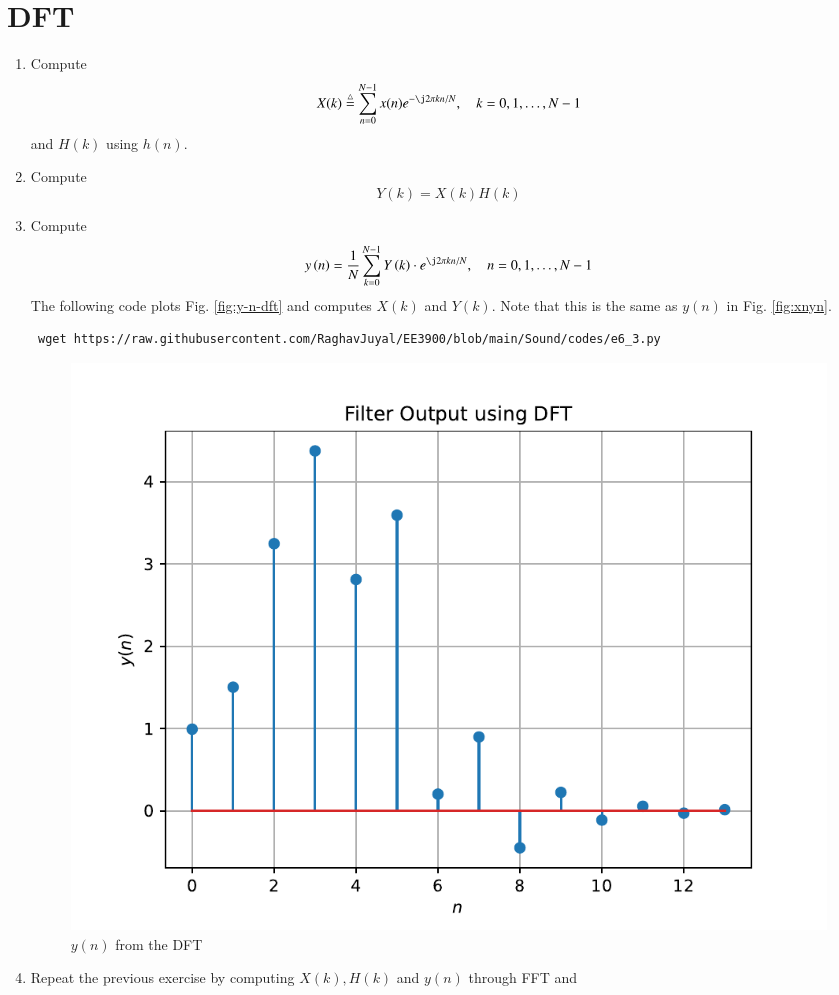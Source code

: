\documentclass[journal,12pt,twocolumn]{IEEEtran}
\renewcommand\thesection{\arabic{section}}
\begin{document}
\section{DFT}
\begin{enumerate}[label=\thesection.\arabic*]
	\item
	Compute
	\begin{equation}
		X(k) \define \sum _{n=0}^{N-1}x(n) e^{-\j2\pi kn/N}, \quad k = 0,1,\dots, N-1
	\end{equation}
	and $H(k)$ using $h(n)$.
	\item Compute 
	\begin{equation}
		Y(k) = X(k)H(k)
		\label{eq:fp}
	\end{equation}
	\item Compute
	\begin{equation}
		y\brak{n}={\frac {1}{N}}\sum _{k=0}^{N-1}Y\brak{k}\cdot e^{\j 2\pi kn/N},\quad n = 0,1,\dots, N-1
		\label{eq:inv-ft}
	\end{equation}
	\solution The following code plots Fig. \eqref{fig:y-n-dft} and computes $X(k)$
	and $Y(k)$. Note that this is the same as $y(n)$ in Fig. \eqref{fig:xnyn}.
	\begin{lstlisting}
 wget https://raw.githubusercontent.com/RaghavJuyal/EE3900/blob/main/Sound/codes/e6_3.py 
	\end{lstlisting}
	\begin{figure}[!ht]
		\centering
		\includegraphics[width=\columnwidth]{figs/prob_6-3.pdf}
		\caption{$y(n)$ from the DFT}
		\label{fig:y-n-dft}
	\end{figure}
	\item Repeat the previous exercise by computing $X(k), H(k)$ and $y(n)$ through FFT and 

\end{enumerate}
\end{document}
